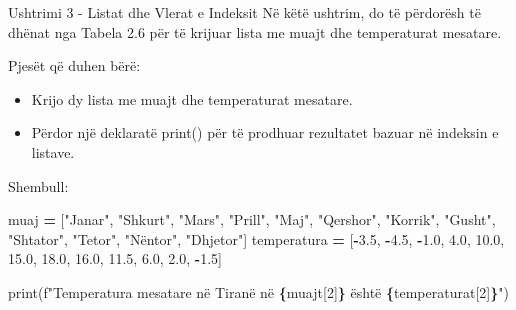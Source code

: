 \documentclass[
  ignorenonframetext,
]{beamer}
\newenvironment{Shaded}{\begin{snugshade}}{\end{snugshade}}
\newcommand{\BuiltInTok}[1]{#1}
\newcommand{\DecValTok}[1]{\textcolor[rgb]{0.00,0.00,0.81}{#1}}
\newcommand{\FloatTok}[1]{\textcolor[rgb]{0.00,0.00,0.81}{#1}}
\newcommand{\NormalTok}[1]{#1}
\newcommand{\OperatorTok}[1]{\textcolor[rgb]{0.81,0.36,0.00}{\textbf{#1}}}
\newcommand{\SpecialCharTok}[1]{\textcolor[rgb]{0.81,0.36,0.00}{\textbf{#1}}}
\newcommand{\SpecialStringTok}[1]{\textcolor[rgb]{0.31,0.60,0.02}{#1}}
\newcommand{\StringTok}[1]{\textcolor[rgb]{0.31,0.60,0.02}{#1}}
\begin{document}
\begin{frame}{Ushtrimi 3 - Listat dhe Vlerat e Indeksit}
\protect\hypertarget{ushtrimi-3---listat-dhe-vlerat-e-indeksit}{}
Në këtë ushtrim, do të përdorësh të dhënat nga Tabela 2.6 për të krijuar
lista me muajt dhe temperaturat mesatare.
\end{frame}

\begin{frame}{Pjesët që duhen bërë:}
\protect\hypertarget{pjesuxebt-quxeb-duhen-buxebruxeb-2}{}
\begin{itemize}
\item
  Krijo dy lista me muajt dhe temperaturat mesatare.
\item
  Përdor një deklaratë print() për të prodhuar rezultatet bazuar në
  indeksin e listave.
\end{itemize}
\end{frame}

\begin{frame}[fragile]{Shembull:}
\protect\hypertarget{shembull-4}{}
\begin{Shaded}
\begin{Highlighting}[]
\NormalTok{muaj }\OperatorTok{=}\NormalTok{ [}\StringTok{"Janar"}\NormalTok{, }\StringTok{"Shkurt"}\NormalTok{, }\StringTok{"Mars"}\NormalTok{, }\StringTok{"Prill"}\NormalTok{, }\StringTok{"Maj"}\NormalTok{, }\StringTok{"Qershor"}\NormalTok{, }\StringTok{"Korrik"}\NormalTok{, }\StringTok{"Gusht"}\NormalTok{, }\StringTok{"Shtator"}\NormalTok{, }\StringTok{"Tetor"}\NormalTok{, }\StringTok{"Nëntor"}\NormalTok{, }\StringTok{"Dhjetor"}\NormalTok{]}
\NormalTok{temperatura }\OperatorTok{=}\NormalTok{ [}\OperatorTok{{-}}\FloatTok{3.5}\NormalTok{, }\OperatorTok{{-}}\FloatTok{4.5}\NormalTok{, }\OperatorTok{{-}}\FloatTok{1.0}\NormalTok{, }\FloatTok{4.0}\NormalTok{, }\FloatTok{10.0}\NormalTok{, }\FloatTok{15.0}\NormalTok{, }\FloatTok{18.0}\NormalTok{, }\FloatTok{16.0}\NormalTok{, }\FloatTok{11.5}\NormalTok{, }\FloatTok{6.0}\NormalTok{, }\FloatTok{2.0}\NormalTok{, }\OperatorTok{{-}}\FloatTok{1.5}\NormalTok{]}

\BuiltInTok{print}\NormalTok{(}\SpecialStringTok{f"Temperatura mesatare në Tiranë në }\SpecialCharTok{\{}\NormalTok{muajt[}\DecValTok{2}\NormalTok{]}\SpecialCharTok{\}}\SpecialStringTok{ është }\SpecialCharTok{\{}\NormalTok{temperaturat[}\DecValTok{2}\NormalTok{]}\SpecialCharTok{\}}\SpecialStringTok{"}\NormalTok{)}
\end{Highlighting}
\end{Shaded}
\end{frame}
\end{document}
